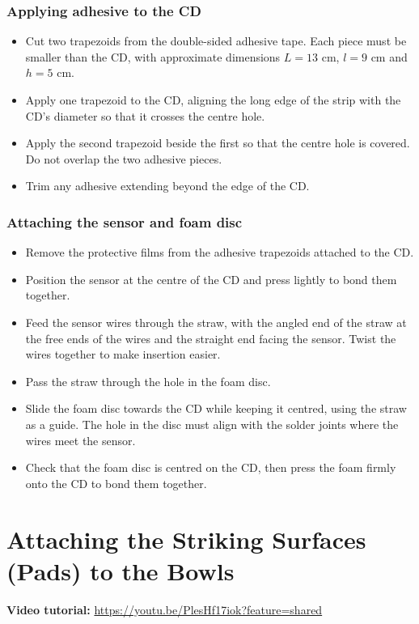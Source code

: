 \documentclass[11pt,a4paper]{article}
\newcommand{\tutorial}[1]{\textbf{Video tutorial:} \url{#1}}
\begin{document}
\subsubsection{Applying adhesive to the CD}
\begin{itemize}
  \item Cut two trapezoids from the double-sided adhesive tape. Each piece must be smaller than the CD, with approximate dimensions $L=13$ cm, $l=9$ cm and $h=5$ cm.
  \item Apply one trapezoid to the CD, aligning the long edge of the strip with the CD's diameter so that it crosses the centre hole.
  \item Apply the second trapezoid beside the first so that the centre hole is covered. Do not overlap the two adhesive pieces.
  \item Trim any adhesive extending beyond the edge of the CD.
\end{itemize}

\subsubsection{Attaching the sensor and foam disc}
\begin{itemize}
  \item Remove the protective films from the adhesive trapezoids attached to the CD.
  \item Position the sensor at the centre of the CD and press lightly to bond them together.
  \item Feed the sensor wires through the straw, with the angled end of the straw at the free ends of the wires and the straight end facing the sensor. Twist the wires together to make insertion easier.
  \item Pass the straw through the hole in the foam disc.
  \item Slide the foam disc towards the CD while keeping it centred, using the straw as a guide. The hole in the disc must align with the solder joints where the wires meet the sensor.
  \item Check that the foam disc is centred on the CD, then press the foam firmly onto the CD to bond them together.
\end{itemize}

\section{Attaching the Striking Surfaces (Pads) to the Bowls}
\tutorial{https://youtu.be/PlesHf17iok?feature=shared}
\end{document}
